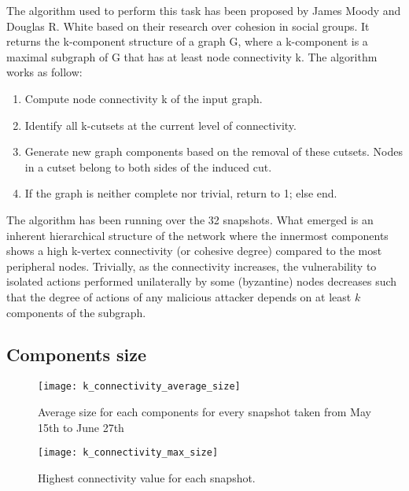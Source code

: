 	The algorithm used to perform this task has been proposed by James Moody and Douglas R. White \cite{Moody2003} based on their research over cohesion in social groups. It returns the k-component structure of a graph G, where a k-component is a maximal subgraph of G that has at least node connectivity k. The algorithm works as follow:
	\begin{enumerate}
		\item Compute node connectivity k of the input graph.
		\item Identify all k-cutsets at the current level of connectivity. 
		\item Generate new graph components based on the removal of these cutsets. Nodes in a cutset belong to both sides of the induced cut.
		\item If the graph is neither complete nor trivial, return to 1; else end.
	\end{enumerate}
	
	The algorithm has been running over the 32 snapshots. What emerged is an inherent hierarchical structure of the network where the innermost components shows a high k-vertex connectivity (or cohesive degree) compared to the most peripheral nodes. Trivially, as the connectivity increases, the vulnerability to isolated actions performed unilaterally by some (byzantine) nodes decreases such that the degree of actions of any malicious attacker depends on at least $k$ components of the subgraph.
	
	\subsection{Components size}
	
	\begin{figure}[ht!]
		\texttt{[image: k\_connectivity\_average\_size]}\\
		\caption{Average size for each components for every snapshot taken from May 15th to June 27th}
		\label{monthly_connectivity_average}
	\end{figure}
	
	\begin{figure}
		\texttt{[image: k\_connectivity\_max\_size]}
		\caption{Highest connectivity value for each snapshot.}
		\label{monthly_connectivity_max_size}
	\end{figure}
	
